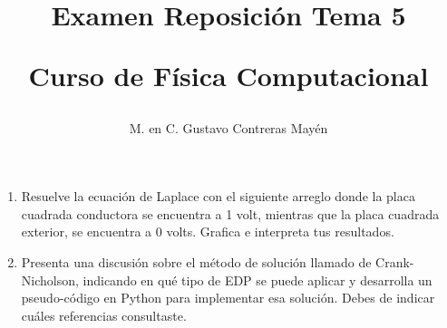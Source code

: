 \documentclass[letterpaper]{article}
\title{Examen Reposición Tema 5 \\ \begin{large}Curso de Física Computacional\end{large}}
\author{M. en C. Gustavo Contreras Mayén}
\date{ }
\begin{document}
\maketitle
\fontsize{14}{14}\selectfont
{}
\begin{enumerate}
\item Resuelve la ecuación de Laplace con el siguiente arreglo donde la placa cuadrada conductora se encuentra a 1 volt, mientras que la placa cuadrada exterior, se encuentra a 0 volts. Grafica e interpreta tus resultados.
\begin{center}
\end{center}
\item Presenta una discusión sobre el método de solución llamado de Crank-Nicholson, indicando en qué tipo de EDP se puede aplicar y desarrolla un pseudo-código en Python para implementar esa solución. Debes de indicar cuáles referencias consultaste.
\end{enumerate}
\end{document}
